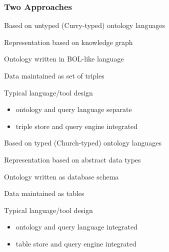 \documentclass{beamer}
\renewcommand{\emph}[1]{\alert{#1}}
\begin{document}
\begin{frame}\frametitle{Two Approaches}
\begin{blockitems}{Based on \emph{untyped} (Curry-typed) ontology languages}
\item Representation based on \emph{knowledge graph}
\item Ontology written in BOL-like language
\item Data maintained as \emph{set of triples}
\item Typical language/tool design
 \begin{itemize}
 \item ontology and query language \emph{separate}
 \item triple store and query engine integrated
 \end{itemize}
\end{blockitems}

\begin{blockitems}{Based on \emph{typed} (Church-typed) ontology languages}
\item Representation based on \emph{abstract data types}
\item Ontology written as database schema
\item Data maintained as \emph{tables}
\item Typical language/tool design
 \begin{itemize}
 \item ontology and query language \emph{integrated}
 \item table store and query engine integrated
 \end{itemize}
\end{blockitems}
\end{frame}
\end{document}

